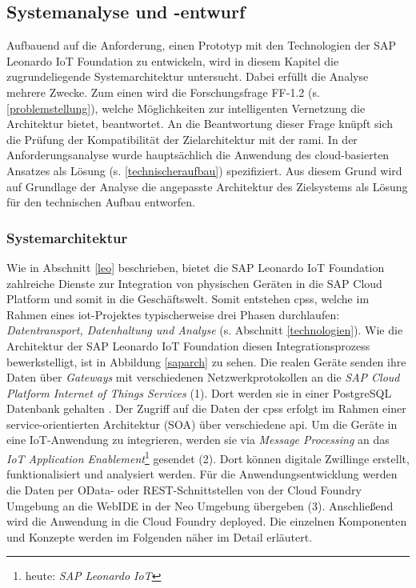 \subsection{Systemanalyse und -entwurf}

Aufbauend auf die Anforderung, einen Prototyp mit den Technologien der SAP Leonardo IoT Foundation zu entwickeln, wird in diesem Kapitel die zugrundeliegende Systemarchitektur untersucht. Dabei erfüllt die Analyse mehrere Zwecke. Zum einen wird die Forschungsfrage FF-1.2 (s. \ref{problemstellung}), welche Möglichkeiten zur intelligenten Vernetzung die Architektur bietet, beantwortet. An die Beantwortung dieser Frage knüpft sich die Prüfung der Kompatibilität der Zielarchitektur mit der \ac{rami}. In der Anforderungsanalyse wurde hauptsächlich die Anwendung des cloud-basierten Ansatzes als Lösung (s. \ref{technischeraufbau}) spezifiziert. Aus diesem Grund wird auf Grundlage der Analyse die angepasste Architektur des Zielsystems als Lösung für den technischen Aufbau entworfen.

\subsubsection{Systemarchitektur}

Wie in Abschnitt \ref{leo} beschrieben, bietet die SAP Leonardo IoT Foundation zahlreiche Dienste zur Integration von physischen Geräten in die SAP Cloud Platform und somit in die Geschäftswelt. Somit entstehen \ac{cpss}, welche im Rahmen eines \ac{iot}-Projektes typischerweise drei Phasen durchlaufen: \textit{Datentransport, Datenhaltung und Analyse} (s. Abschnitt \ref{technologien}). Wie die Architektur der SAP Leonardo IoT Foundation diesen Integrationsprozess bewerkstelligt, ist in Abbildung \ref{saparch} zu sehen. Die realen Geräte senden ihre Daten über \textit{Gateways} mit verschiedenen Netzwerkprotokollen an die \textit{SAP Cloud Platform Internet of Things Services} (1). Dort werden sie in einer PostgreSQL Datenbank gehalten \citep{Acharya2019}. Der Zugriff auf die Daten der \ac{cpss} erfolgt im Rahmen einer service-orientierten Architektur (SOA) über verschiedene \ac{api}. Um die Geräte in eine IoT-Anwendung zu integrieren, werden sie via \textit{Message Processing} an das \textit{IoT Application Enablement}\footnote{heute: \textit{SAP Leonardo IoT}} gesendet (2). Dort können digitale Zwillinge erstellt, funktionalisiert und analysiert werden. Für die Anwendungsentwicklung werden die Daten per OData- oder REST-Schnittstellen von der Cloud Foundry Umgebung an die WebIDE in der Neo Umgebung übergeben (3). Anschließend wird die Anwendung in die Cloud Foundry deployed. Die einzelnen Komponenten und Konzepte werden im Folgenden näher im Detail erläutert.

